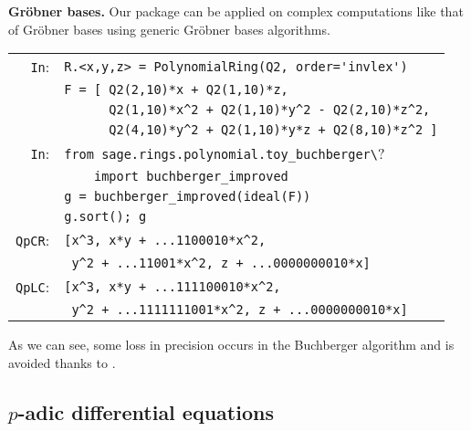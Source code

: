 \documentclass[sigconf]{acmart}
\newcommand{\ZpFP}{\text{\color{output} \rm \tt ZpFP}\xspace}
\newcommand{\ZpL}{\text{\color{output} \rm \tt ZpL}\xspace}
\newcommand{\cIn}{{\color{input} \tt \phantom{Zp}In}:}
\newcommand{\cQpCR}{{\color{output} \tt QpCR}:}
\newcommand{\cQpLC}{{\color{output} \tt QpLC}:}
\theoremstyle{definition}
\begin{document}
\medskip

\noindent \textbf{Gröbner bases.}
%
Our package can be applied on complex computations like that of Gröbner 
bases using generic Gröbner bases algorithms.

\smallskip

{\noindent \small
\begin{tabular}{@{}rl}
\cIn
 & \verb?R.<x,y,z> = ?{\color{constructor}\verb?PolynomialRing?}\verb?(?{\color{ring}\verb?Q2?}\verb?, order=?{\color{string}\verb?'invlex'?}\verb?)? \\
 & \verb?F = [ ?{\color{ring}\verb?Q2?}\verb?(2,10)*x + ?{\color{ring}\verb?Q2?}\verb?(1,10)*z, ? \\
 & \verb?      ?{\color{ring}\verb?Q2?}\verb?(1,10)*x^2 + ?{\color{ring}\verb?Q2?}\verb?(1,10)*y^2 - ?{\color{ring}\verb?Q2?}\verb?(2,10)*z^2,? \\
 & \verb?      ?{\color{ring}\verb?Q2?}\verb?(4,10)*y^2 + ?{\color{ring}\verb?Q2?}\verb?(1,10)*y*z + ?{\color{ring}\verb?Q2?}\verb?(8,10)*z^2 ]? \\
\cIn
 & {\color{keyword}\verb?from?}\verb? sage.rings.polynomial.toy_buchberger\?\\
 & \verb?    ?{\color{keyword}\verb?import?}\verb? ?{\color{function}\verb?buchberger_improved?} \\
 & \verb?g = ?{\color{function}\verb?buchberger_improved?}\verb?(ideal(F))? \\
 & \verb?g.?{\color{method}\verb?sort?}\verb?(); g? \\
\cQpCR
 & \verb?[x^3, x*y + ...1100010*x^2,? \\
 & \verb? y^2 + ...11001*x^2, z + ...0000000010*x]? \\
\cQpLC
 & \verb?[x^3, x*y + ...111100010*x^2,? \\
 & \verb? y^2 + ...1111111001*x^2, z + ...0000000010*x]? \\
\end{tabular}}

\smallskip

\noindent
As we can see, some loss in precision occurs in the
Buchberger algorithm and is avoided thanks to \ZpL.

\subsection{$p$-adic differential equations}
\label{ssec:diffeq}
\end{document}
